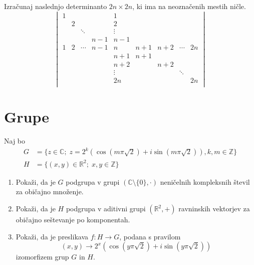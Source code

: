 \documentclass[a4paper,12pt]{article}
\begin{document}
Izračunaj naslednjo determinanto \(2n \times 2n\), ki ima na neoznačenih mestih ničle.
\[
    \begin{vmatrix}
    1 & & & & 1 & & & & \\
    & 2 & & & 2 & & & & \\
    & & \ddots & & \vdots & & & & \\
    & & & n-1 & n-1 & & & & \\
    1 & 2 & \cdots & n-1 & n & n+1 & n+2 & \cdots & 2n \\
    & & & & n+1 & n+1 & & & \\
    & & & & n+2 & & n+2 & & \\
    & & & & \vdots & & & \ddots & \\
    & & & & 2n & & & & 2n \\
    \end{vmatrix}
\]
%
%

\section*{Grupe}

Naj bo
\begin{align*}
G &= \{z \in \mathbb{C};\; z=2^k(\cos(m\pi\sqrt{2}) + i \sin(m\pi\sqrt{2})), k, m \in \mathbb{Z}\} \\
H &= \{(x,y)\in\mathbb{R}^2;\; x,y \in \mathbb{Z}\}
\end{align*}
\begin{enumerate}
\item
Pokaži, da je \(G\) podgrupa v grupi \((\mathbb{C} \setminus \{0\}, \cdot)\)
neničelnih kompleksnih števil za običajno množenje.

\item
Pokaži, da je \(H\) podgrupa v aditivni grupi \((\mathbb{R}^2, +)\)
ravninskih vektorjev za običajno seštevanje po komponentah.

\item
Pokaži, da je preslikava \(f:H\to G\), podana s pravilom
\[(x,y) \to 2^x(\cos(y\pi\sqrt{2}) + i \sin(y\pi\sqrt{2}))\]
izomorfizem grup \(G\) in \(H\).
\end{enumerate}
\end{document}

